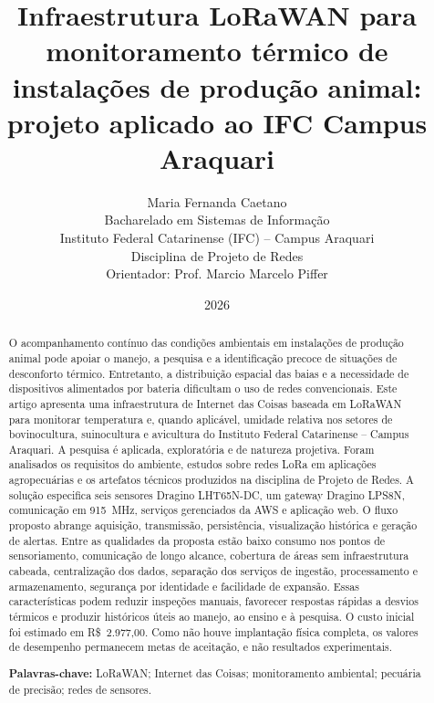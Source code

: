 \documentclass[10pt,a4paper,twocolumn]{article}
\title{\textbf{Infraestrutura LoRaWAN para monitoramento térmico de instalações de produção animal: projeto aplicado ao IFC Campus Araquari}}
\author{
  Maria Fernanda Caetano\\
  \small Bacharelado em Sistemas de Informação\\
  \small Instituto Federal Catarinense (IFC) -- Campus Araquari\\
  \small Disciplina de Projeto de Redes\\
  \small Orientador: Prof. Marcio Marcelo Piffer
}
\date{2026}
\newcommand{\keywords}[1]{\noindent\textbf{Palavras-chave:} #1}
\begin{document}
\maketitle

\begin{abstract}
\noindent
O acompanhamento contínuo das condições ambientais em instalações de produção
animal pode apoiar o manejo, a pesquisa e a identificação precoce de situações de
desconforto térmico. Entretanto, a distribuição espacial das baias e a necessidade
de dispositivos alimentados por bateria dificultam o uso de redes convencionais.
Este artigo apresenta uma infraestrutura de Internet das Coisas
baseada em LoRaWAN para monitorar temperatura e, quando aplicável, umidade
relativa nos setores de bovinocultura, suinocultura e avicultura do Instituto
Federal Catarinense -- Campus Araquari. A pesquisa é aplicada, exploratória e de
natureza projetiva. Foram analisados os requisitos do ambiente, estudos sobre
redes LoRa em aplicações agropecuárias e os artefatos técnicos produzidos na
disciplina de Projeto de Redes. A solução especifica seis sensores Dragino
LHT65N-DC, um gateway Dragino LPS8N, comunicação em \SI{915}{\mega\hertz},
serviços gerenciados da AWS e aplicação web. O
fluxo proposto abrange aquisição, transmissão, persistência, visualização
histórica e geração de alertas. Entre as qualidades da proposta estão baixo
consumo nos pontos de sensoriamento, comunicação de longo alcance, cobertura de
áreas sem infraestrutura cabeada, centralização dos dados, separação dos
serviços de ingestão, processamento e armazenamento, segurança por identidade e
facilidade de expansão. Essas características podem reduzir inspeções manuais,
favorecer respostas rápidas a desvios térmicos e produzir históricos úteis ao
 manejo, ao ensino e à pesquisa. O custo inicial foi estimado em
R\$~2.977,00. Como não houve implantação física completa, os valores de
desempenho permanecem metas de aceitação, e não resultados experimentais.

\medskip
\keywords{LoRaWAN; Internet das Coisas; monitoramento ambiental; pecuária de precisão; redes de sensores.}
\end{abstract}
\end{document}
